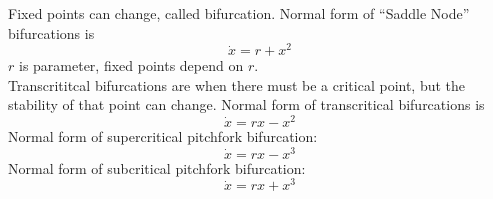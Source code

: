 \documentclass{article}
\date{Winter Semester 2022}
\author{\EC}
\begin{document}
\maketitle
Fixed points can change, called bifurcation. Normal form of ``Saddle Node'' bifurcations is $$\dot{x}=r+x^2$$
$r$ is parameter, fixed points depend on $r$.
\\
Transcrititcal bifurcations are when there must be a critical point, but the stability of that point can change. Normal form of transcritical bifurcations is 
$$\dot{x}=rx-x^2$$
Normal form of supercritical pitchfork bifurcation: 
$$\dot{x}=rx-x^3$$
Normal form of subcritical pitchfork bifurcation:
$$\dot{x}=rx+x^3$$
\end{document}
